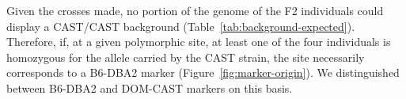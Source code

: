 
Given the crosses made, no portion of the genome of the F2 individuals could display a CAST/CAST background (Table~\ref{tab:background-expected}).
Therefore, if, at a given polymorphic site, at least one of the four individuals is homozygous for the allele carried by the CAST strain, the site necessarily corresponds to a B6-DBA2 marker (Figure~\ref{fig:marker-origin}).
We distinguished between B6-DBA2 and DOM-CAST markers on this basis.



